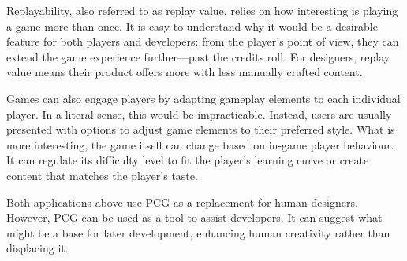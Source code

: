 



Replayability, also referred to as replay value, relies on how interesting is playing a game more than once. It is easy to understand why it would be a desirable feature for both players and developers: from the player's point of view, they can extend the game experience further---past the credits roll. For designers, replay value means their product offers more with less manually crafted content.


Games can also engage players by adapting gameplay elements to each individual player. In a literal sense, this would be impracticable. Instead, users are usually presented with options to adjust game elements to their preferred style. What is more interesting, the game itself can change based on in-game player behaviour. It can regulate its difficulty level to fit the player's learning curve or create content that matches the player's taste.


Both applications above use PCG as a replacement for human designers. However, PCG can be used as a tool to assist developers. It can suggest what might be a base for later development, enhancing human creativity rather than displacing it. 

